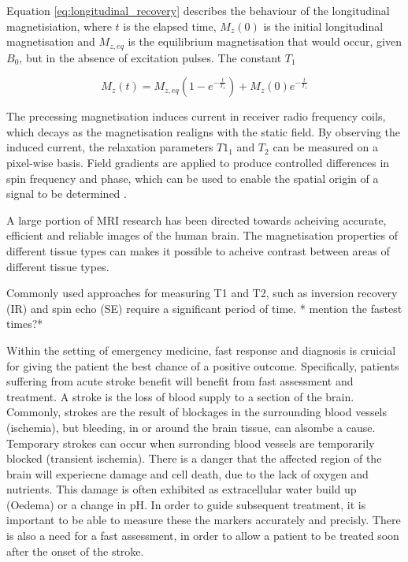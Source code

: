 \documentclass[review]{elsarticle}
\begin{document}
Equation \eqref{eq:longitudinal_recovery} describes the behaviour of the longitudinal magnetisiation, where $ t $ is the elapsed time, $M_{z}(0)$ is the initial longitudinal magnetisation and $M_{z,eq}$ is the equilibrium magnetisation that would occur, given $B_0$, but in the absence of excitation pulses. The constant $T_1$

\begin{equation} \label{eq:longitudinal_recovery}
M_{z} (t) = M_{z,eq}(1 - e^{-\frac{t}{T_1}} ) + M_{z}(0)e^{-\frac{t}{T_1} } 
\end{equation}

The precessing magnetisation induces current in receiver radio frequency coils, which decays as the magnetisation realigns with the static field. By observing the induced current, the relaxation parameters $T1_1$ and $T_2$ can be measured on a pixel-wise basis. Field gradients are applied to produce controlled differences in spin frequency and phase, which can be used to enable the spatial origin of a signal to be determined \cite{haackemagnetic}.

A large portion of MRI research has been directed towards acheiving accurate, efficient and reliable images of the human brain.  The magnetisation properties of different tissue types can makes it possible to acheive contrast between areas of different tissue types.

Commonly used approaches for measuring T1 and T2, such as inversion recovery (IR) and spin echo (SE) require a significant period of time. * mention the fastest times?*  %

Within the setting of emergency medicine, fast response and diagnosis is cruicial for giving the patient the best chance of a positive outcome. Specifically, patients suffering from acute stroke benefit will benefit from fast assessment and treatment. A stroke is the loss of blood supply to a section of the brain. Commonly, strokes are the result of blockages in the surrounding blood vessels (ischemia), but bleeding, in or around the brain tissue, can alsombe a cause. Temporary strokes can occur when surronding blood vessels are temporarily blocked (transient ischemia). There is a danger that the affected region of the brain will experiecne damage and cell death, due to the lack of oxygen and nutrients. This damage is often exhibited as extracellular water build up (Oedema) or a change in pH. In order to guide subsequent treatment, it is important to be able to measure these the markers accurately and precisly. There is also a need for a fast assessment, in order to allow a patient to be treated soon after the onset of the stroke.
\end{document}
